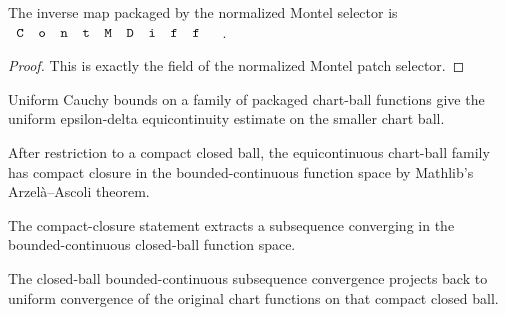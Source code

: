 \begin{lemma}
\label{lem:global-gluing-contmdiff-inv-map}
The inverse map packaged by the normalized Montel selector is
\(\code{ContMDiff}\).
\leanok
\end{lemma}
\begin{proof}\leanok
This is exactly the  field of the
normalized Montel patch selector.
\end{proof}

\begin{lemma}
\label{lem:montel-chartball-equicontinuity}
Uniform Cauchy bounds on a family of packaged chart-ball functions give the
uniform epsilon-delta equicontinuity estimate on the smaller chart ball.
\leanok
\end{lemma}

\begin{lemma}
\label{lem:montel-chartball-arzela-ascoli-compact}
After restriction to a compact closed ball, the equicontinuous chart-ball
family has compact closure in the bounded-continuous function space by
Mathlib's Arzel\`a--Ascoli theorem.
\leanok
\end{lemma}

\begin{lemma}
\label{lem:montel-chartball-subsequence-extraction}
The compact-closure statement extracts a subsequence converging in the
bounded-continuous closed-ball function space.
\leanok
\end{lemma}

\begin{lemma}
\label{lem:montel-chartball-uniform-closed-ball-limit}
The closed-ball bounded-continuous subsequence convergence projects back to
uniform convergence of the original chart functions on that compact closed
ball.
\leanok
\end{lemma}

